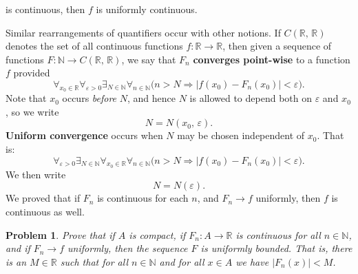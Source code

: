 \documentclass{article}
\theoremstyle{normal}
\newtheorem{problem}{Problem}
\newif\ifsolution
\begin{document}
    is continuous, then $f$ is uniformly continuous.
    \par\hfill\par
    Similar rearrangements of quantifiers occur with other notions.
    If $C(\mathbb{R},\,\mathbb{R})$ denotes the set of all continuous
    functions $f:\mathbb{R}\rightarrow\mathbb{R}$, then given a sequence
    of functions $F:\mathbb{N}\rightarrow{C}(\mathbb{R},\,\mathbb{R})$,
    we say that $F_{n}$ \textbf{converges point-wise} to a function $f$
    provided
    \begin{equation}
        \forall_{x_{0}\in\mathbb{R}}
        \forall_{\varepsilon>0}
        \exists_{N\in\mathbb{N}}
        \forall_{n\in\mathbb{N}}
        \Big(
            n>N
            \Rightarrow
            |f(x_{0})-F_{n}(x_{0})|<\varepsilon
        \Big).
    \end{equation}
    Note that $x_{0}$ occurs \textit{before} $N$, and hence $N$ is allowed to
    depend both on $\varepsilon$ and $x_{0}$, so we write
    \begin{equation}
        N
        =
        N(x_{0},\,\varepsilon).
    \end{equation}
    \textbf{Uniform convergence} occurs when $N$ may be chosen independent of
    $x_{0}$. That is:
    \begin{equation}
        \forall_{\varepsilon>0}
        \exists_{N\in\mathbb{N}}
        \forall_{x_{0}\in\mathbb{R}}
        \forall_{n\in\mathbb{N}}
        \Big(
            n>N
            \Rightarrow
            |f(x_{0})-F_{n}(x_{0})|<\varepsilon
        \Big).
    \end{equation}
    We then write
    \begin{equation}
        N
        =
        N(\varepsilon).
    \end{equation}
    We proved that if $F_{n}$ is continuous for each $n$, and
    $F_{n}\rightarrow{f}$ uniformly, then $f$ is continuous as well.
    \begin{problem}
        \par\hfill\par
        Prove that if $A$ is compact, if $F_{n}:A\rightarrow\mathbb{R}$ is
        continuous for all $n\in\mathbb{N}$, and if $F_{n}\rightarrow{f}$
        uniformly, then the sequence $F$ is uniformly bounded. That is, there
        is an $M\in\mathbb{R}$ such that for all $n\in\mathbb{N}$ and for all
        $x\in{A}$ we have $|F_{n}(x)|<M$.
    \end{problem}
    \ifsolution
        \color{blue}
\end{document}
